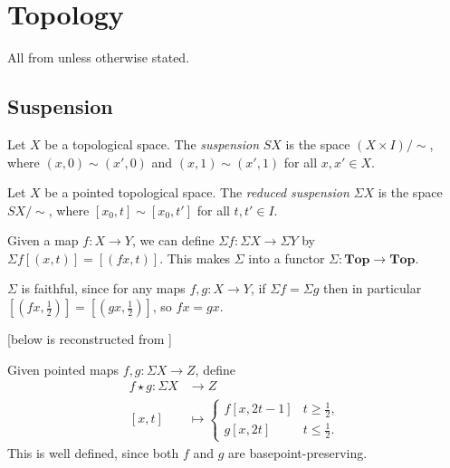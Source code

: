 \documentclass{MetricNotes2023}
\begin{document}
\section{Topology}

All from \autocite{hatcher} unless otherwise stated.

\subsection{Suspension}

\begin{definition}
Let \(X\) be a topological space. The \textit{suspension} \(SX\) is the space \newline\((X\times I)/\sim\), where \((x, 0)\sim (x', 0)\) and \((x,1)\sim (x',1)\) for all \(x,x'\in X\). 
\end{definition}

\begin{definition}
Let \(X\) be a pointed topological space. The \textit{reduced suspension} \(\Sigma X\) is the space \(SX/\sim\), where \([x_0, t]\sim [x_0, t']\) for all \(t,t'\in I\). 
\end{definition}

Given a map \(f : X \to Y\), we can define \(\Sigma f : \Sigma X \to \Sigma Y\) by \(\Sigma f[(x, t)]=[(fx, t)]\). This makes \(\Sigma \) into a functor \(\Sigma : \textbf{Top}\to \textbf{Top}\). 

\begin{remark}\label{2502141442}
\(\Sigma\) is faithful, since for any maps \(f, g : X\to Y\), if \(\Sigma f = \Sigma g\) then in particular \([(fx, \frac{1}{2})]=[(gx, \frac{1}{2})]\), so \(fx=gx\). 
\end{remark}  

[below is reconstructed from  \autocite{mazelgee}]

Given pointed maps \(f, g : \Sigma X \to Z\), define 
\begin{align*}
f \star g : \Sigma X &\to Z\\
[x,t]&\mapsto \begin{cases}
f[x,2t-1] & t \geq \frac{1}{2},\\
g[x,2t] &t\leq \frac{1}{2}.
\end{cases}
\end{align*}
This is well defined, since both \(f\) and \(g\) are basepoint-preserving. %
\end{document}
